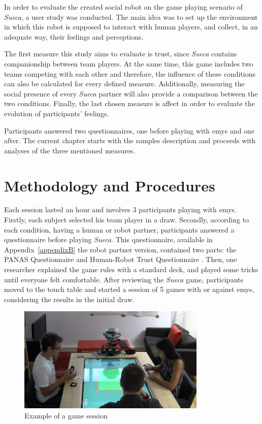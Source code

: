 \label{chapter:results}

In order to evaluate the created social robot on the game playing scenario of \emph{Sueca}, a user study was conducted.
The main idea was to set up the environment in which this robot is supposed to interact with human players, and collect, in an adequate way, their feelings and perceptions.

The first measure this study aims to evaluate is trust, since \emph{Sueca} contains companionship between team players.
At the same time, this game includes two teams competing with each other and therefore, the influence of these conditions can also be calculated for every defined measure.
Additionally, measuring the social presence of every \emph{Sueca} partner will also provide a comparison between the two conditions.
Finally, the last chosen measure is affect in order to evaluate the evolution of participants' feelings.

Participants answered two questionnaires, one before playing with \ac{emys} and one after.
The current chapter starts with the samples description and proceeds with analyses of the three mentioned measures.

\section{Methodology and Procedures}
Each session lasted an hour and involves 3 participants playing with \ac{emys}.
Firstly, each subject selected his team player in a draw.
Secondly, according to each condition, having a human or robot partner, participants answered a questionnaire before playing \emph{Sueca}.
This questionnaire, available in Appendix~\ref{appendixB} the robot partner version, contained two parts: the PANAS Questionnaire \cite{Egloff1998} and Human-Robot Trust Questionnaire \cite{Schaefer2013}.
Then, one researcher explained the game rules with a standard deck, and played some tricks until everyone felt comfortable.
After reviewing the \emph{Sueca} game, participants moved to the touch table and started a session of 5 games with or against \ac{emys}, considering the results in the initial draw.

\begin{figure}[h!]
  \centering
    \includegraphics[width=0.8\textwidth]{./img/7/userStudies}
  \caption{Example of a game session}
\label{fig:userStudies}
\end{figure}

